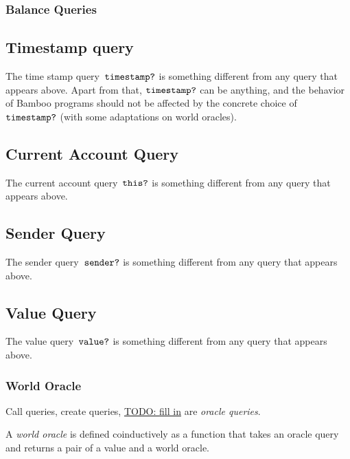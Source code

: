 \documentclass{book}
\newcommand{\todo}[1]{\underline{TODO: {#1}}}
\begin{document}
\subsubsection{Balance Queries}

\subsection{Timestamp query}

\newcommand{\timestampQuery}{\text{\texttt{timestamp?}}}
The time stamp query~$\timestampQuery$ is something different from any query that appears above. Apart from that, $\timestampQuery$ can be anything, and the behavior of Bamboo programs should not be affected by the concrete choice of $\timestampQuery$ (with some adaptations on world oracles).

\subsection{Current Account Query}

\newcommand{\thisQuery}[0]{\text{\texttt{this?}}}

The current account query~$\thisQuery$ is something different from any query that appears above.

\subsection{Sender Query}

\newcommand{\senderQuery}{\text{\texttt{sender?}}}

The sender query~$\senderQuery$ is something different from any query that appears above.

\subsection{Value Query}

\newcommand{\valueQuery}{\text{\texttt{value?}}}

The value query~$\valueQuery$ is something different from any query that appears above.

\subsubsection{World Oracle}

Call queries, create queries, \todo{fill in} are \textit{oracle queries}.

A \textit{world oracle} is defined coinductively as a function that takes an oracle query and returns a pair of a value and a world oracle.
\end{document}
